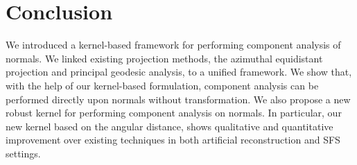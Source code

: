 \section{Conclusion}\label{sec:conclusion}
We introduced a kernel-based framework for performing component analysis of normals. We linked existing projection methods, the azimuthal equidistant projection and principal geodesic analysis, to a unified framework. We show that, with the help of our kernel-based formulation, component analysis can be performed directly upon normals without transformation. We also propose a new robust kernel for performing component analysis on normals. In particular, our new kernel based on the angular distance, shows qualitative and quantitative improvement over existing techniques in both artificial reconstruction and SFS settings.
